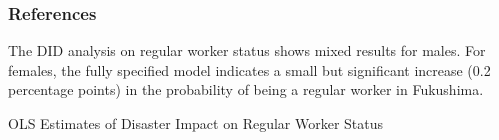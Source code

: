 \documentclass[serif, aspectratio=169]{beamer}
\begin{document}


\begin{frame}[allowframebreaks]
    \frametitle{References}
    \small %
    
\end{frame}




\begin{frame}

The DID analysis on regular worker status shows mixed results for males. For females, the fully specified model indicates a small but significant increase (0.2 percentage points) in the probability of being a regular worker in Fukushima.

\begin{table}[htbp]
\centering
\caption{OLS Estimates of Disaster Impact on Regular Worker Status}

\vspace{-0.2cm}


\vspace{-0.2cm}


\end{table}
\end{frame}
\end{document}
